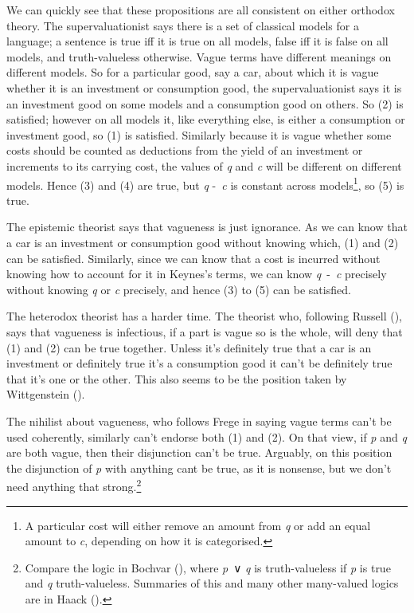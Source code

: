 \documentclass[
  11pt,
  letterpaper,
  DIV=11,
  numbers=noendperiod,
  twoside]{scrartcl}
\begin{document}
We can quickly see that these propositions are all consistent on either
orthodox theory. The supervaluationist says there is a set of classical
models for a language; a sentence is true iff it is true on all models,
false iff it is false on all models, and truth-valueless otherwise.
Vague terms have different meanings on different models. So for a
particular good, say a car, about which it is vague whether it is an
investment or consumption good, the supervaluationist says it is an
investment good on some models and a consumption good on others. So (2)
is satisfied; however on all models it, like everything else, is either
a consumption or investment good, so (1) is satisfied. Similarly because
it is vague whether some costs should be counted as deductions from the
yield of an investment or increments to its carrying cost, the values of
\emph{q} and \emph{c} will be different on different models. Hence (3)
and (4) are true, but \emph{q} -~\emph{c} is constant across
models\footnote{A particular cost will either remove an amount from
  \emph{q} or add an equal amount to \emph{c}, depending on how it is
  categorised.}, so (5) is true.

The epistemic theorist says that vagueness is just ignorance. As we can
know that a car is an investment or consumption good without knowing
which, (1) and (2) can be satisfied. Similarly, since we can know that a
cost is incurred without knowing how to account for it in Keynes's
terms, we can know \emph{q}~-~\emph{c} precisely without knowing
\emph{q} or \emph{c} precisely, and hence (3) to (5) can be satisfied.

The heterodox theorist has a harder time. The theorist who, following
Russell (), says that vagueness is
infectious, if a part is vague so is the whole, will deny that (1) and
(2) can be true together. Unless it's definitely true that a car is an
investment or definitely true it's a consumption good it can't be
definitely true that it's one or the other. This also seems to be the
position taken by Wittgenstein ().

The nihilist about vagueness, who follows Frege in saying vague terms
can't be used coherently, similarly can't endorse both (1) and (2). On
that view, if \emph{p} and \emph{q} are both vague, then their
disjunction can't be true. Arguably, on this position the disjunction of
\emph{p} with anything cant be true, as it is nonsense, but we don't
need anything that strong.\footnote{Compare the logic in Bochvar
  (), where \emph{p}~∨ \emph{q} is
  truth-valueless if \emph{p} is true and \emph{q} truth-valueless.
  Summaries of this and many other many-valued logics are in Haack
  ().}
\end{document}
